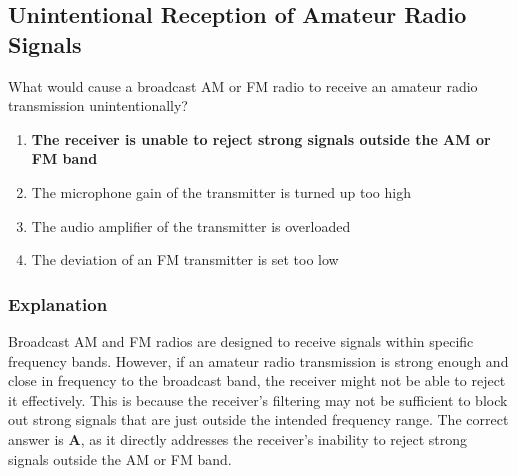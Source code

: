 \subsection{Unintentional Reception of Amateur Radio Signals}
\label{T7B02}

\begin{tcolorbox}[colback=gray!10!white,colframe=black!75!black,title=T7B02]
What would cause a broadcast AM or FM radio to receive an amateur radio transmission unintentionally?
\begin{enumerate}[noitemsep]
    \item \textbf{The receiver is unable to reject strong signals outside the AM or FM band}
    \item The microphone gain of the transmitter is turned up too high
    \item The audio amplifier of the transmitter is overloaded
    \item The deviation of an FM transmitter is set too low
\end{enumerate}
\end{tcolorbox}

\subsubsection*{Explanation}
Broadcast AM and FM radios are designed to receive signals within specific frequency bands. However, if an amateur radio transmission is strong enough and close in frequency to the broadcast band, the receiver might not be able to reject it effectively. This is because the receiver's filtering may not be sufficient to block out strong signals that are just outside the intended frequency range. The correct answer is \textbf{A}, as it directly addresses the receiver's inability to reject strong signals outside the AM or FM band.